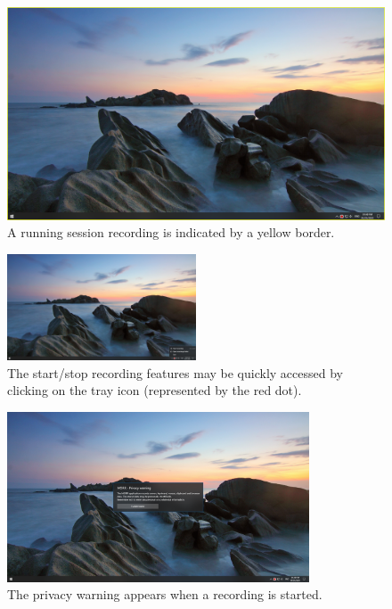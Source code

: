 \begin{figure}[H]
  \includegraphics[width=1.00\textwidth]{resources/ui_recording.png}
  \centering
  \caption{A running \gls{session} recording is indicated by a yellow border.}
  \label{fig:sm_ui_recordindicator}
\end{figure}
\begin{figure}[H]
  \includegraphics[width=0.5\textwidth, trim={50cm 0 0 25cm},clip]{resources/ui_inactive_tray.png}
  \centering
  \caption{The start/stop recording features may be quickly accessed by clicking on the tray icon (represented by the red dot).}
  \label{fig:sm_ui_trayicon}
\end{figure}
\begin{figure}[H]
  \includegraphics[width=0.8\textwidth, trim={20cm 10cm 20cm 10cm}, clip]{resources/ui_privacy_warning.png}
  \centering
  \caption{The privacy warning appears when a recording is started.}
  \label{fig:sm_ui_privacy}
\end{figure}
